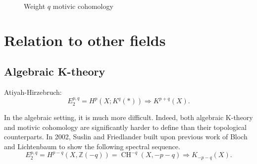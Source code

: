 \documentclass[leqno, openany]{memoir}
\theoremstyle{definition}
\theoremstyle{remark}
\theoremstyle{plain}
\theoremstyle{definition}
\theoremstyle{remark}
\newcommand{\Z}{\mathbb{Z}}
\newcommand{\mc}[1]{\mathcal{#1}}
\DeclareMathOperator{\Pic}{Pic}
\DeclareMathOperator{\CH}{CH}
\begin{document}
\begin{figure}[htpb] \begin{center}  \end{center} \caption{Weight $q$
                            motivic cohomology}%
                        \end{figure}


 

\section{Relation to other fields} \subsection{Algebraic K-theory}
Atiyah-Hirzebruch: \[E_2^{p, q}=H^p(X; K^q(*))\Rightarrow K^{p+q}(X).\]

In the algebraic setting, it is much more difficult.  Indeed, both algebraic
K-theory and motivic cohomology are significantly harder to define than their
topological counterparts.  In 2002, Suslin and Friedlander built upon previous
work of Bloch and Lichtenbaum to show the following spectral sequence.  \[
    E_2^{p,q}=H^{p-q}(X, \Z(-q))=\CH^{-q}(X, -p-q)\Rightarrow K_{-p-q}(X).  \]
\end{document}
